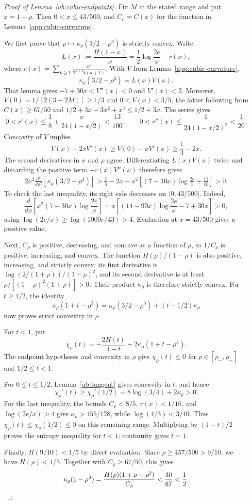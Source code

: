 \documentclass[11pt,letterpaper]{amsart}
\newcommand{\1}{\mathbf 1}
\numberwithin{equation}{section}
\begin{document}
\begin{proof}[Proof of Lemma~\ref{ub:cubic-endpoints}]
Fix $M$ in the stated range and put $x=1-\rho$.
Then $0<x\le43/500$, and $C_\rho=C(x)$ for the function
in Lemma~\ref{app:cubic-curvature}.

We first prove that
$\rho\mapsto\kappa_\rho(3/2-\rho^3)$ is strictly convex.
Write
\[
 L(x):=\frac{H(1-x)}x
 =\frac12\log\frac{2e}{x}-r(x),
\]
where $r(x)=\sum_{k\ge1}\frac{x^k}{2^{k+1}k(k+1)}$.
With $V$ from Lemma~\ref{app:cubic-curvature},
\[
 \kappa_\rho(3/2-\rho^3)=L(x)V(x).
\]
That lemma gives
$-7+30x<V''(x)<0$ and $V'(x)<2$.
Moreover,
$V(0)=1/[2(3-2M)]\ge1/3$ and $0<V(x)<3/5$,
the latter following from $C(x)\ge67/50$ and
$1/2+3x-3x^2+x^3\le1/2+3x$.
The series gives
\[
 0<r'(x)\le\frac18+\frac{x}{24(1-x/2)}<\frac{13}{100},\qquad
 0<r''(x)\le\frac1{24(1-x/2)^2}<\frac1{20}.
\]
Concavity of $V$ implies
\[
 V(x)-2xV'(x)\ge V(0)-xV'(x)\ge\frac13-2x.
\]
The second derivatives in $x$ and $\rho$ agree.
Differentiating $L(x)V(x)$ twice and discarding the positive
term $-r(x)V''(x)$ therefore gives
\[
 \begin{split}
 2x^2\frac{d^2}{d\rho^2}
       [\kappa_\rho(3/2-\rho^3)]
 >\frac13-2x
  -x^2\left[(7-30x)\log\frac{2e}{x}+\frac{11}{10}\right]
 >0.
 \end{split}
\]
To check the last inequality, its right side decreases on
$(0,43/500]$. Indeed,
\[
 \frac{d}{dx}\left[x^2(7-30x)\log\frac{2e}{x}\right]
 =x\left[(14-90x)\log\frac{2e}{x}-7+30x\right]>0,
\]
using $\log(2e/x)\ge\log(1000e/43)>4$.
Evaluation at $x=43/500$ gives a positive value.

Next, $C_\rho$ is positive, decreasing, and concave as a function
of $\rho$, so $1/C_\rho$ is positive, increasing, and convex.
The function $H(\rho)/(1-\rho)$ is also positive, increasing,
and strictly convex: its first derivative is
$\log(2/(1+\rho))/(1-\rho)^2$, and its second derivative is at least
$\rho/[(1-\rho)^2(1+\rho)]>0$.
Their product $\kappa_\rho$ is therefore strictly convex.
For $t\ge1/2$, the identity
\[
 \kappa_\rho(1+t-\rho^3)
 =\kappa_\rho(3/2-\rho^3)+(t-1/2)\kappa_\rho
\]
now proves strict convexity in $\rho$.

For $t<1$, put
\[
 \chi_\rho(t)
 =-\frac{2H(t)}{1-t}+2\kappa_\rho(1+t-\rho^3).
\]
The endpoint hypotheses and convexity in $\rho$ give
$\chi_\rho(t)\le0$ for
$\rho\in[\rho_-,\rho_+]$ and $1/2\le t<1$.

For $0\le t\le1/2$, Lemma~\ref{ub:tangent} gives concavity in $t$,
and hence
\[
 \chi_\rho'(t)\ge\chi_\rho'(1/2)
 =8\log(3/4)+2\kappa_\rho>0.
\]
For the last inequality, the bounds
$C_\rho<8/5$, $r(x)<1/16$, and $\log(2e/x)>4$ give
$\kappa_\rho>155/128$, while $\log(4/3)<3/10$.
Thus $\chi_\rho(t)\le\chi_\rho(1/2)\le0$ on this remaining range.
Multiplying by $(1-t)/2$ proves the entropy inequality for $t<1$;
continuity gives $t=1$.

Finally, $H(9/10)<1/5$ by direct evaluation.
Since $\rho\ge457/500>9/10$, we have $H(\rho)<1/5$.
Together with $C_\rho\ge67/50$, this gives
\[
 \kappa_\rho(1-\rho^3)
 =\frac{H(\rho)(1+\rho+\rho^2)}{C_\rho}
 <\frac{30}{67}<\frac12. \qedhere
\]
\end{proof}
\end{document}
